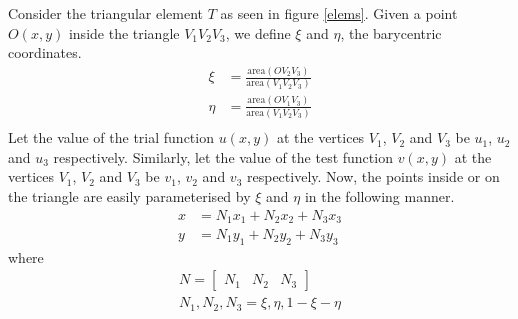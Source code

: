 \documentclass{article}
\begin{document}
Consider the triangular element $T$
as seen in figure \ref{elems}.
Given a point $O(x,y)$ inside the triangle $V_1V_2V_3$,
we define $\xi$ and $\eta$,
the barycentric coordinates.
\begin{align*}
  \xi &= \frac{\text{area}(OV_2V_3)}{\text{area}(V_1V_2V_3)} \\
  \eta &= \frac{\text{area}(OV_1V_3)}{\text{area}(V_1V_2V_3)} \\
\end{align*}
Let the value of the trial function $u(x,y)$
at the vertices $V_1$, $V_2$ and $V_3$
be $u_1$, $u_2$ and $u_3$ respectively.
Similarly,
let the value of the test function $v(x,y)$
at the vertices $V_1$, $V_2$ and $V_3$
be $v_1$, $v_2$ and $v_3$ respectively.
Now, the points inside or on the triangle
are easily parameterised by $\xi$ and $\eta$
in the following manner.
\begin{align}
  x &= N_1 x_1 + N_2 x_2 + N_3 x_3 \label{x}\\
  y &= N_1 y_1 + N_2 y_2 + N_3 y_3 \label{y}
\end{align}
where
\begin{align*}
	N = \begin{bmatrix} N_1 & N_2 & N_3 \end{bmatrix} \\
	N_1, N_2, N_3 = \xi, \eta, 1 - \xi - \eta
\end{align*}
\end{document}
